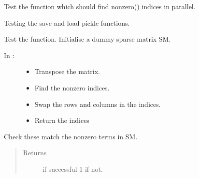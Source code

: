 \documentclass[letterpaper,10pt,english]{sphinxmanual}
\begin{document}

\begin{fulllineitems}
\label{index:DictionarySparseMatrix.test_17}
Test the {\hyperref[index:DictionarySparseMatrix.parnonzero]{}} function which should find   nonzero() indices in parallel.

\end{fulllineitems}


\begin{fulllineitems}
\label{index:DictionarySparseMatrix.test_18}
Testing the save and load pickle functions.

\end{fulllineitems}


\begin{fulllineitems}
\label{index:DictionarySparseMatrix.test_19}
Test the  function.
Initialise a dummy sparse matrix SM.
\begin{description}
\item[{In :}] \leavevmode\begin{itemize}
\item {} 
Transpose the matrix.

\item {} 
Find the nonzero indices.

\item {} 
Swap the rows and columns in the indices.

\item {} 
Return the indices

\end{itemize}

\end{description}

Check these match the nonzero terms in SM.
\begin{quote}\begin{description}
\item[{Returns}]  if successful 1 if not.

\end{description}\end{quote}

\end{fulllineitems}
\end{document}
